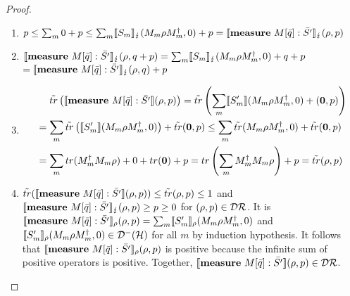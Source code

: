 \documentclass[a4paper,UKenglish,cleveref, autoref, thm-restate]{lipics-v2021}
\begin{document}
\begin{proof}
\begin{itemize}
\begin{enumerate}
            \item $p \leq \sum_m 0 + p \leq \sum_m \llbracket S_m  \rrbracket_{\lightning} (M_m \rho M_m ^\dagger ,0) +p =\llbracket \mathbf{measure } \text{ }M[\Bar{q}]:\Bar{S'} \rrbracket_{\lightning}(\rho,p)$

            \item $\llbracket \mathbf{measure } \text{ }M[\Bar{q}]:\Bar{S'} \rrbracket_{\lightning}(\rho,q+p) =\sum_m \llbracket S_m  \rrbracket_{\lightning} (M_m \rho M_m ^\dagger ,0) +q+p $\\
            $= \llbracket \mathbf{measure } \text{ }M[\Bar{q}]:\Bar{S'} \rrbracket_{\lightning}(\rho,q) + p$

            \item
            \begin{align*}
                &\phantom{=.}\tilde{tr}\left(\llbracket \mathbf{measure } \text{ }M[\Bar{q}]:\Bar{S'} \rrbracket(\rho,p)\right) = \tilde{tr}\left(\sum_m \llbracket S'_m \rrbracket(M_m \rho M_m ^\dagger,0) +(\mathbf{0},p)\right) \\
                &= \sum_m  \tilde{tr}\left(\llbracket S'_m \rrbracket(M_m \rho M_m ^\dagger,0)\right) + \tilde{tr}(\mathbf{0},p)
                \leq \sum_m \tilde{tr}(M_m \rho M_m ^\dagger,0) + \tilde{tr}(\mathbf{0},p) \\
                &= \sum_m tr(M_m ^\dagger M_m \rho )+0 + tr(\mathbf{0})+p =  tr\left(\sum_m M_m ^\dagger M_m \rho \right)+p = \tilde{tr}(\rho,p)
            \end{align*}

            \item $\tilde{tr}(\llbracket \mathbf{measure } \text{ }M[\Bar{q}]:\Bar{S'} \rrbracket(\rho,p))\leq \tilde{tr}(\rho,p)\leq 1$ and $ \llbracket \mathbf{measure } \text{ }M[\Bar{q}]:\Bar{S'} \rrbracket_{\lightning}(\rho,p)\geq p \geq 0$ for $(\rho,p) \in \mathcal{D}\mathcal{R}$.
            It is $\llbracket \mathbf{measure } \text{ }M[\Bar{q}]:\Bar{S'} \rrbracket_{\rho}(\rho,p) = \sum_m \llbracket S'_m \rrbracket_{\rho}(M_m \rho M_m ^\dagger ,0)$ and $\llbracket S'_m \rrbracket_{\rho}(M_m \rho M_m ^\dagger ,0) \in \mathcal{D}^- (\mathcal{H})$ for all $m$ by induction hypothesis. It follows that $\llbracket \mathbf{measure } \text{ }M[\Bar{q}]:\Bar{S'} \rrbracket_{\rho}(\rho,p)$ is positive because the infinite sum of positive operators is positive.
            Together, $\llbracket \mathbf{measure } \text{ }M[\Bar{q}]:\Bar{S'} \rrbracket(\rho,p) \in \mathcal{D}\mathcal{R}$.


\end{enumerate}
\end{itemize}
\end{proof}
\end{document}
